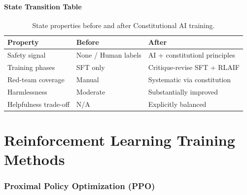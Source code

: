 \documentclass{article}
\begin{document}
\subsection{State Transition Table}
\begin{table}[h]\centering
\begin{tabular}{lll}\toprule
\textbf{Property} & \textbf{Before} & \textbf{After}\\\midrule
Safety signal & None / Human labels & AI + constitutionl principles\\
Training phases & SFT only & Critique-revise SFT + RLAIF\\
Red-team coverage & Manual & Systematic via constitution\\
Harmlessness & Moderate & Substantially improved\\
Helpfulness trade-off & N/A & Explicitly balanced\\\bottomrule
\end{tabular}
\caption{State properties before and after Constitutional AI training.}
\end{table}

\newpage
\part{Reinforcement Learning Training Methods}

\section{Proximal Policy Optimization (PPO)}
\end{document}
